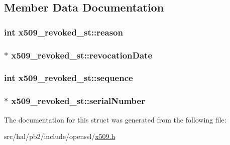 \subsection{Member Data Documentation}
\subsubsection[{\texorpdfstring{reason}{reason}}]{\setlength{\rightskip}{0pt plus 5cm}int x509\+\_\+revoked\+\_\+st\+::reason}\hypertarget{structx509__revoked__st_afc9d299c76450dd5f2937000b97795b2}{}\label{structx509__revoked__st_afc9d299c76450dd5f2937000b97795b2}
\subsubsection[{\texorpdfstring{revocation\+Date}{revocationDate}}]{$\ast$ x509\+\_\+revoked\+\_\+st\+::revocation\+Date}\hypertarget{structx509__revoked__st_a9a86c7c9efcdf5a3289123ea82da8268}{}\label{structx509__revoked__st_a9a86c7c9efcdf5a3289123ea82da8268}
\subsubsection[{\texorpdfstring{sequence}{sequence}}]{\setlength{\rightskip}{0pt plus 5cm}int x509\+\_\+revoked\+\_\+st\+::sequence}\hypertarget{structx509__revoked__st_a361a3358c3a578178e6482fc9a28ea86}{}\label{structx509__revoked__st_a361a3358c3a578178e6482fc9a28ea86}
\subsubsection[{\texorpdfstring{serial\+Number}{serialNumber}}]{$\ast$ x509\+\_\+revoked\+\_\+st\+::serial\+Number}\hypertarget{structx509__revoked__st_a3b638a3caba10ce8daf6992fdd13658c}{}\label{structx509__revoked__st_a3b638a3caba10ce8daf6992fdd13658c}


The documentation for this struct was generated from the following file\+:\begin{DoxyCompactItemize}
\item 
src/hal/pb2/include/openssl/\hyperlink{x509_8h}{x509.\+h}\end{DoxyCompactItemize}
